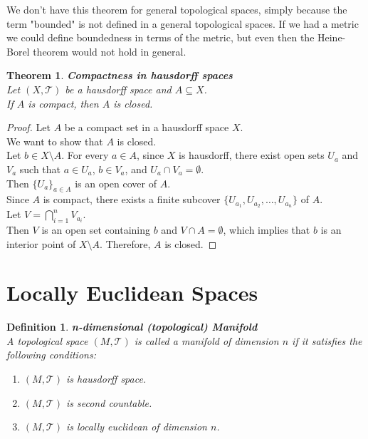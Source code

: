 \documentclass[11pt]{book} %
\newtheorem{theorem}{Theorem}[section]
\newtheorem{definition}{Definition}[section]
\begin{document}
We don't have this theorem for general topological spaces, simply because the term "bounded" is not defined in a general topological spaces.
If we had a metric we could define boundedness in terms of the metric, but even then the Heine-Borel theorem would not hold in general.

\begin{theorem}{\textbf{Compactness in hausdorff spaces}} \\
    Let \( (X, \mathcal{T}) \) be a hausdorff space and \( A \subseteq X \). \\ 
    If \( A \) is compact, then \( A \) is closed.
\end{theorem}

\begin{proof}
    Let \( A \) be a compact set in a hausdorff space \( X \). \\
    We want to show that \( A \) is closed. \\
    Let \( b \in X \setminus A \). 
    For every \( a \in A \), since \( X \) is hausdorff, there exist open sets \( U_a \) and \( V_a \) such that \( a \in U_a \), \( b \in V_a \), and \( U_a \cap V_a = \emptyset \). \\
    Then \( \{ U_a \}_{a \in A} \) is an open cover of \( A \). \\
    Since \( A \) is compact, there exists a finite subcover \( \{ U_{a_1}, U_{a_2}, \ldots, U_{a_n} \} \) of \( A \). \\
    Let \( V = \bigcap_{i=1}^n V_{a_i} \). \\
    Then \( V \) is an open set containing \( b \) and \( V \cap A = \emptyset \), which implies that \( b \) is an interior point of \( X \setminus A \). 
    Therefore, \( A \) is closed.
\end{proof}




\section{Locally Euclidean Spaces}

\begin{definition}{\textbf{n-dimensional (topological) Manifold}} \\
    A topological space \( (M , \mathcal{T}) \) is called a manifold of dimension \( n \) if it satisfies the following conditions:
    \begin{enumerate}
        \item \( (M , \mathcal{T}) \) is hausdorff space.
        \item \( (M , \mathcal{T}) \) is second countable.
        \item \( (M, \mathcal{T}) \) is locally euclidean of dimension \( n \).
    \end{enumerate}
\end{definition}
\end{document}
